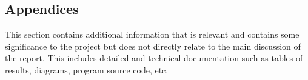 \subsection{Appendices}

This section contains additional information that is relevant and contains some significance to the project but does not directly relate to the main discussion of the report. This includes detailed and technical documentation such as tables of results, diagrams, program source code, etc.

